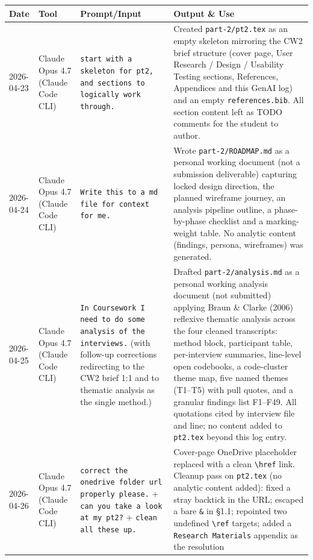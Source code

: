 \documentclass[a4paper,11pt]{article}
\begin{document}
\vspace{0.5em}
\noindent
\begin{longtable}{@{}p{1.8cm}p{2.8cm}p{4.5cm}p{4.5cm}@{}}
\toprule
\textbf{Date} & \textbf{Tool} & \textbf{Prompt/Input} & \textbf{Output \& Use} \\
\midrule
\endhead
2026-04-23
& Claude Opus 4.7 (Claude Code CLI)
& \texttt{start with a skeleton for pt2, and sections to logically
  work through.}
& Created \texttt{part-2/pt2.tex} as an empty skeleton mirroring the
  CW2 brief structure (cover page, User Research / Design /
  Usability Testing sections, References, Appendices and this
  GenAI log) and an empty \texttt{references.bib}. All section
  content left as TODO comments for the student to author. \\
\midrule
2026-04-24
& Claude Opus 4.7 (Claude Code CLI)
& \texttt{Write this to a md file for context for me.}
& Wrote \texttt{part-2/ROADMAP.md} as a personal working document
  (not a submission deliverable) capturing locked design direction,
  the planned wireframe journey, an analysis pipeline outline, a
  phase-by-phase checklist and a marking-weight table. No analytic
  content (findings, persona, wireframes) was generated. \\
\midrule
2026-04-25
& Claude Opus 4.7 (Claude Code CLI)
& \texttt{In Coursework I need to do some analysis of the
  interviews.} (with follow-up corrections redirecting to the CW2
  brief 1:1 and to thematic analysis as the single method.)
& Drafted \texttt{part-2/analysis.md} as a personal working
  analysis document (not submitted) applying Braun \& Clarke (2006)
  reflexive thematic analysis across the four cleaned transcripts:
  method block, participant table, per-interview summaries,
  line-level open codebooks, a code-cluster theme map, five named
  themes (T1--T5) with pull quotes, and a granular findings list
  F1--F49. All quotations cited by interview file and line; no
  content added to \texttt{pt2.tex} beyond this log entry. \\
\midrule
2026-04-26
& Claude Opus 4.7 (Claude Code CLI)
& \texttt{correct the onedrive folder url properly please.} +
  \texttt{can you take a look at my pt2?} + \texttt{clean all
  these up.}
& Cover-page OneDrive placeholder replaced with a clean
  \texttt{\textbackslash href} link. Cleanup pass on
  \texttt{pt2.tex} (no analytic content added): fixed a stray
  backtick in the URL; escaped a bare \texttt{\&} in \S1.1;
  repointed two undefined \texttt{\textbackslash ref} targets;
  added a \texttt{Research Materials} appendix as the resolution

\end{longtable}
\end{document}
